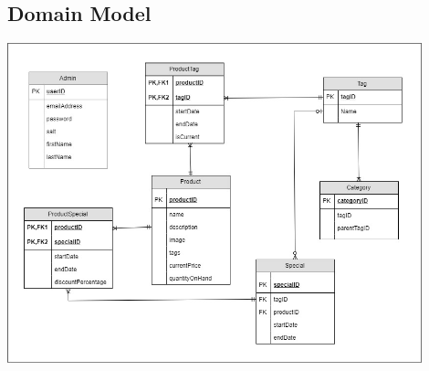 \documentclass[a4paper,10pt]{article}
\begin{document}
\subsection{Domain Model}
\includegraphics[width=12cm]{Domain_Model.jpg}


\newpage
\clearpage
\end{document}
